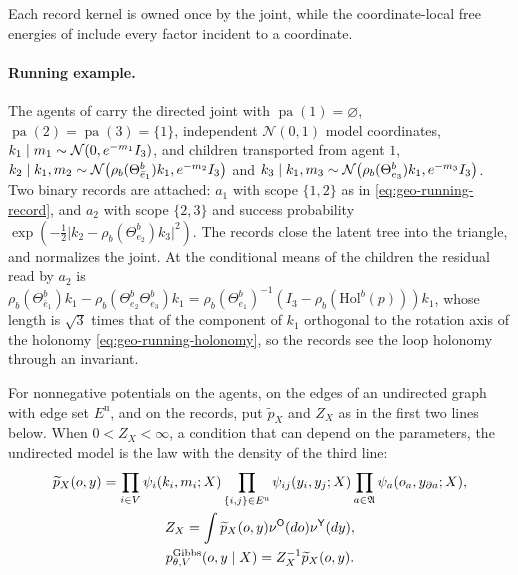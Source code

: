 Each record kernel is owned once by the joint, while the coordinate-local free energies of 
include every factor incident to a coordinate.

\paragraph{Running example.}
The agents of  carry the directed joint with
$\operatorname{pa}(1)=\varnothing$, $\operatorname{pa}(2)=\operatorname{pa}(3)=\{1\}$, independent
$\mathcal N(0,1)$ model coordinates, $k_1\mid m_1\sim\mathcal N(0,e^{-m_1}I_3)$, and children
transported from agent $1$,
$k_2\mid k_1,m_2\sim\mathcal N\bigl(\rho_b(\Theta^b_{\bar e_1})k_1,e^{-m_2}I_3\bigr)$ and
$k_3\mid k_1,m_3\sim\mathcal N\bigl(\rho_b(\Theta^b_{e_3})k_1,e^{-m_3}I_3\bigr)$. Two binary records are
attached: $a_1$ with scope $\{1,2\}$ as in \eqref{eq:geo-running-record}, and $a_2$ with scope $\{2,3\}$
and success probability $\exp(-\tfrac12\lvert k_2-\rho_b(\Theta^b_{e_2})k_3\rvert^2)$. The records close the
latent tree into the triangle, and  normalizes the joint.
At the conditional means of the children the residual read by $a_2$ is
$\rho_b(\Theta^b_{\bar e_1})k_1-\rho_b(\Theta^b_{e_2}\Theta^b_{e_3})k_1
=\rho_b(\Theta^b_{e_1})^{-1}(I_3-\rho_b(\mathrm{Hol}^b(p)))k_1$, whose length is $\sqrt3$ times that of
the component of $k_1$ orthogonal to the rotation axis of the holonomy \eqref{eq:geo-running-holonomy},
so the records see the loop holonomy through an invariant.

For nonnegative potentials on the agents, on the edges of an undirected graph with edge set
$E^{\mathrm u}$, and on the records, put $\widetilde p_X$ and $Z_X$ as in the first two lines below.
When $0<Z_X<\infty$, a condition that can depend on the parameters, the undirected model is the law with
the density of the third line:
\begin{gather}
\widetilde p_X(o,y)
=\prod_{i\in V}\psi_i(k_i,m_i;X)
\prod_{\{i,j\}\in E^{\mathrm u}}\psi_{ij}(y_i,y_j;X)
\prod_{a\in\mathfrak A}\psi_a(o_a,y_{\partial a};X),
\label{eq:gen-gibbs-potential}\\
Z_X
=\int\widetilde p_X(o,y)\nu^{\mathsf O}(do)\nu^{\mathsf Y}(dy),
\label{eq:gen-gibbs-partition}\\
p_{\theta,V}^{\mathrm{Gibbs}}(o,y\mid X)=Z_X^{-1}\widetilde p_X(o,y).
\label{eq:gen-gibbs-density}
\end{gather}

